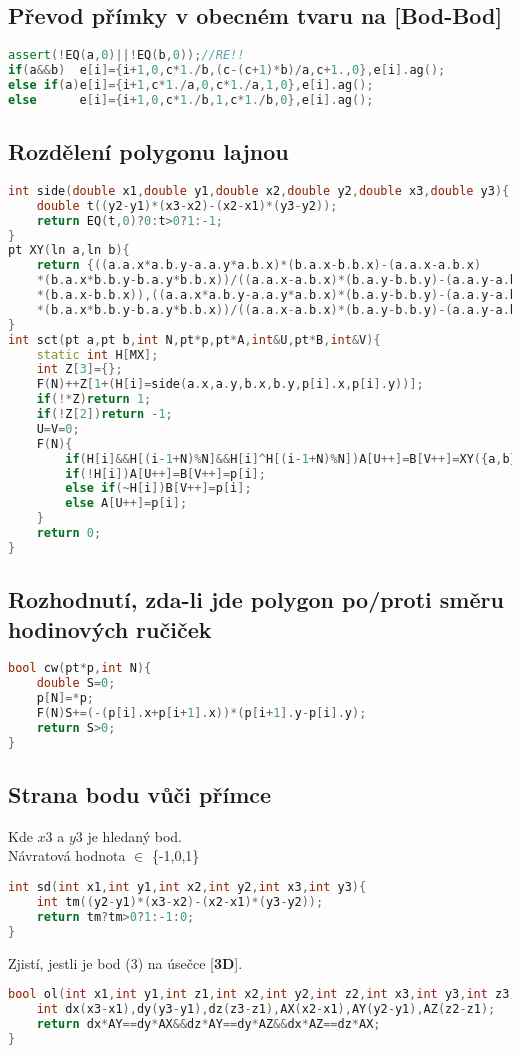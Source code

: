 \documentclass[11pt]{article}
\begin{document}
\subsection{Převod přímky v obecném tvaru na [Bod-Bod]}
\begin{lstlisting}[language=C++]
assert(!EQ(a,0)||!EQ(b,0));//RE!!
if(a&&b)  e[i]={i+1,0,c*1./b,(c-(c+1)*b)/a,c+1.,0},e[i].ag();
else if(a)e[i]={i+1,c*1./a,0,c*1./a,1,0},e[i].ag();
else      e[i]={i+1,0,c*1./b,1,c*1./b,0},e[i].ag();

\end{lstlisting}
\subsection{Rozdělení polygonu lajnou}

\begin{lstlisting}[language=C++]
int side(double x1,double y1,double x2,double y2,double x3,double y3){
    double t((y2-y1)*(x3-x2)-(x2-x1)*(y3-y2));
    return EQ(t,0)?0:t>0?1:-1;
}
pt XY(ln a,ln b){
    return {((a.a.x*a.b.y-a.a.y*a.b.x)*(b.a.x-b.b.x)-(a.a.x-a.b.x)
    *(b.a.x*b.b.y-b.a.y*b.b.x))/((a.a.x-a.b.x)*(b.a.y-b.b.y)-(a.a.y-a.b.y)
    *(b.a.x-b.b.x)),((a.a.x*a.b.y-a.a.y*a.b.x)*(b.a.y-b.b.y)-(a.a.y-a.b.y)
    *(b.a.x*b.b.y-b.a.y*b.b.x))/((a.a.x-a.b.x)*(b.a.y-b.b.y)-(a.a.y-a.b.y)*(b.a.x-b.b.x))};
}
int sct(pt a,pt b,int N,pt*p,pt*A,int&U,pt*B,int&V){
    static int H[MX];
    int Z[3]={};
    F(N)++Z[1+(H[i]=side(a.x,a.y,b.x,b.y,p[i].x,p[i].y))];
    if(!*Z)return 1;
    if(!Z[2])return -1;
    U=V=0;
    F(N){
        if(H[i]&&H[(i-1+N)%N]&&H[i]^H[(i-1+N)%N])A[U++]=B[V++]=XY({a,b},{p[i],p[(i-1+N)%N]});
        if(!H[i])A[U++]=B[V++]=p[i];
        else if(~H[i])B[V++]=p[i];
        else A[U++]=p[i];
    }
    return 0;
}
\end{lstlisting}
\subsection{Rozhodnutí, zda-li jde polygon po/proti směru hodinových ručiček}
\begin{lstlisting}[language=C++]
bool cw(pt*p,int N){
    double S=0;
    p[N]=*p;
    F(N)S+=(-(p[i].x+p[i+1].x))*(p[i+1].y-p[i].y);
    return S>0;
}
\end{lstlisting}
\subsection{Strana bodu vůči přímce}
Kde $x3$ a $y3$ je hledaný bod.
\\Návratová hodnota $\in$ \{-1,0,1\}
\begin{lstlisting}[language=C++]
int sd(int x1,int y1,int x2,int y2,int x3,int y3){
    int tm((y2-y1)*(x3-x2)-(x2-x1)*(y3-y2));
    return tm?tm>0?1:-1:0;
}
\end{lstlisting}
Zjistí, jestli je bod (3) na úsečce [\textbf{3D}].
\begin{lstlisting}[language=C++]
bool ol(int x1,int y1,int z1,int x2,int y2,int z2,int x3,int y3,int z3){
    int dx(x3-x1),dy(y3-y1),dz(z3-z1),AX(x2-x1),AY(y2-y1),AZ(z2-z1);
	return dx*AY==dy*AX&&dz*AY==dy*AZ&&dx*AZ==dz*AX;
}
\end{lstlisting}
\end{document}
